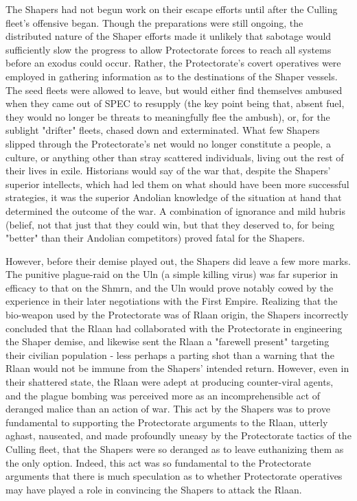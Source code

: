 The Shapers had not begun work on their escape efforts until after the
Culling fleet's offensive began. Though the preparations were still
ongoing, the distributed nature of the Shaper efforts made it unlikely
that sabotage would sufficiently slow the progress to allow
Protectorate forces to reach all systems before an exodus could
occur. Rather, the Protectorate's covert operatives were employed in
gathering information as to the destinations of the Shaper
vessels. The seed fleets were allowed to leave, but would either find
themselves ambused when they came out of SPEC to resupply (the key
point being that, absent fuel, they would no longer be threats to
meaningfully flee the ambush), or, for the sublight "drifter" fleets,
chased down and exterminated. What few Shapers slipped through the
Protectorate's net would no longer constitute a people, a culture, or
anything other than stray scattered individuals, living out the rest
of their lives in exile. Historians would say of the war that, despite
the Shapers' superior intellects, which had led them on what should
have been more successful strategies, it was the superior Andolian
knowledge of the situation at hand that determined the outcome of the
war. A combination of ignorance and mild hubris (belief, not that just
that they could win, but that they deserved to, for being "better"
than their Andolian competitors) proved fatal for the Shapers.

However, before their demise played out, the Shapers did leave a few
more marks. The punitive plague-raid on the Uln (a simple killing
virus) was far superior in efficacy to that on the Shmrn, and the Uln
would prove notably cowed by the experience in their later
negotiations with the First Empire. Realizing that the bio-weapon used
by the Protectorate was of Rlaan origin, the Shapers incorrectly
concluded that the Rlaan had collaborated with the Protectorate in
engineering the Shaper demise, and likewise sent the Rlaan a "farewell
present" targeting their civilian population - less perhaps a parting
shot than a warning that the Rlaan would not be immune from the
Shapers' intended return. However, even in their shattered state, the
Rlaan were adept at producing counter-viral agents, and the plague
bombing was perceived more as an incomprehensible act of deranged
malice than an action of war. This act by the Shapers was to prove
fundamental to supporting the Protectorate arguments to the Rlaan,
utterly aghast, nauseated, and made profoundly uneasy by the
Protectorate tactics of the Culling fleet, that the Shapers were so
deranged as to leave euthanizing them as the only option. Indeed, this
act was so fundamental to the Protectorate arguments that there is
much speculation as to whether Protectorate operatives may have played
a role in convincing the Shapers to attack the Rlaan.

